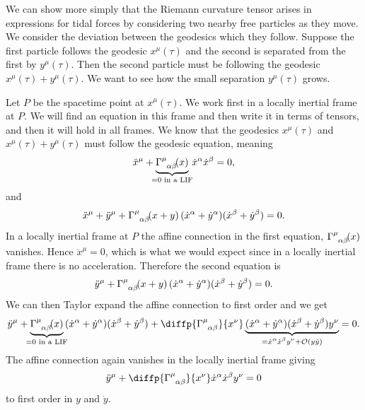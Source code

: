 \documentclass[fleqn]{NotesClass}
\newcommand*{\christoffel}[3]{\tensor{\Gamma}{^{#1}_{{#2}{#3}}}}
\newcommand*{\order}{\mathcal{O}}
\begin{document}
    We can show more simply that the Riemann curvature tensor arises in expressions for tidal forces by considering two nearby free particles as they move.
    We consider the deviation between the geodesics which they follow.
    Suppose the first particle follows the geodesic \(x^\mu(\tau)\) and the second is separated from the first by \(y^\mu(\tau)\).
    Then the second particle must be following the geodesic \(x^\mu(\tau) + y^\mu(\tau)\).
    We want to see how the small separation \(y^\mu(\tau)\) grows.
    
    Let \(P\) be the spacetime point at \(x^\mu(\tau)\).
    We work first in a locally inertial frame at \(P\).
    We will find an equation in this frame and then write it in terms of tensors, and then it will hold in all frames.
    We know that the geodesics \(x^\mu(\tau)\) and \(x^\mu(\tau) + y^\mu(\tau)\) must follow the geodesic equation, meaning
    \begin{equation}
        \ddot{x}^\mu + \underbrace{\christoffel{\mu}{\alpha}{\beta}\!(x)}_{\mathclap{=0\text{ in a LIF}}}\,\dot{x}^\alpha\dot{x}^\beta = 0,
    \end{equation}
    and
    \begin{equation}
        \ddot{x}^\mu + \ddot{y}^\mu + \christoffel{\mu}{\alpha}{\beta}\!(x + y)\,(\dot{x}^\alpha + \dot{y}^\alpha)(\dot{x}^\beta + \dot{y}^\beta) = 0.
    \end{equation}
    In a locally inertial frame at \(P\) the affine connection in the first equation, \(\christoffel{\mu}{\alpha}{\beta}\!(x)\) vanishes.
    Hence \(\ddot{x}^\mu = 0\), which is what we would expect since in a locally inertial frame there is no acceleration.
    Therefore the second equation is
    \begin{equation}
        \ddot{y}^\mu + \christoffel{\mu}{\alpha}{\beta}\!(x + y)\,(\dot{x}^\alpha + \dot{y}^\alpha)(\dot{x}^\beta + \dot{y}^\beta) = 0.
    \end{equation}
    We can then Taylor expand the affine connection to first order and we get
    \begin{equation}
        \ddot{y}^\mu + \underbrace{\christoffel{\mu}{\alpha}{\beta}\!(x)}_{\mathclap{=0\text{ in a LIF}}}\,(\dot{x}^\alpha + \dot{y}^\alpha)(\dot{x}^\beta + \dot{y}^\beta) + \diffp{\christoffel{\mu}{\alpha}{\beta}}{x^\nu}\underbrace{(\dot{x}^\alpha + \dot{y}^\alpha)(\dot{x}^\beta + \dot{y}^\beta) y^\nu}_{\mathclap{=\dot{x}^\alpha\dot{x}^\beta y^\nu + \order(y\dot{y})}} = 0.
    \end{equation}
    The affine connection again vanishes in the locally inertial frame giving
    \begin{equation}\label{eqn:geodesic deviation derivation}
        \ddot{y}^\mu + \diffp{\christoffel{\mu}{\alpha}{\beta}}{x^\nu} \dot{x}^\alpha\dot{x}^\beta y^\nu = 0
    \end{equation}
    to first order in \(y\) and \(\dot{y}\).
    
\end{document}
